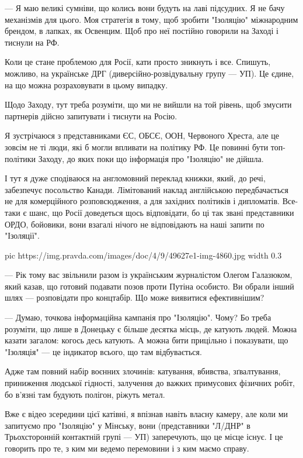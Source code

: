 — Я маю великі сумніви, що колись вони будуть на лаві підсудних. Я не бачу
механізмів для цього. Моя стратегія в тому, щоб зробити "Ізоляцію" міжнародним
брендом, в лапках, як Освенцим. Щоб про неї постійно говорили на Заході і
тиснули на РФ.

Коли це стане проблемою для Росії, кати просто зникнуть і все. Спишуть,
можливо, на українське ДРГ (диверсійно-розвідувальну групу — УП). Це єдине, на
що можна розраховувати в цьому випадку.

Щодо Заходу, тут треба розуміти, що ми не вийшли на той рівень, щоб змусити
партнерів дійсно запитувати і тиснути на Росію.

Я зустрічаюся з представниками ЄС, ОБСЄ, ООН, Червоного Хреста, але це зовсім
не ті люди, які б могли впливати на політику РФ. Це повинні бути топ-політики
Заходу, до яких поки що інформація про "Ізоляцію" не дійшла. 

І тут я дуже сподіваюся на англомовний переклад книжки, який, до речі,
забезпечує посольство Канади. Лімітований наклад англійською передбачається не
для комерційного розповсюдження, а для західних політиків і дипломатів.
Все-таки є шанс, що Росії доведеться щось відповідати, бо ці так звані
представники ОРДО, бойовики, вони взагалі нічого не відповідають на наші запити
по "Ізоляції".

\ifcmt
pic https://img.pravda.com/images/doc/4/9/49627e1-img-4860.jpg
width 0.3
\fi

— Рік тому вас звільнили разом із українським журналістом Олегом Галазюком,
який казав, що готовий подавати позов проти Путіна особисто. Ви обрали інший
шлях — розповідати про концтабір. Що може виявитися ефективнішим?

— Думаю, точкова інформаційна кампанія про "Ізоляцію". Чому? Бо треба розуміти,
що лише в Донецьку є більше десятка місць, де катують людей. Можна казати
загалом: когось десь катують. А можна бити прицільно і показувати, що
"Ізоляція" — це індикатор всього, що там відбувається.

Адже там повний набір воєнних злочинів: катування, вбивства, зґвалтування,
приниження людської гідності, залучення до важких примусових фізичних робіт, бо
в’язні там будують полігон, ріжуть метал.

Вже є відео зсередини цієї катівні, я впізнав навіть власну камеру, але коли ми
запитуємо про "Ізоляцію" у Мінську, вони (представники "Л/ДНР" в Трьохсторонній
контактній групі — УП) заперечують, що це місце існує. І це говорить про те, з
ким ми ведемо перемовини і з ким маємо справу.

